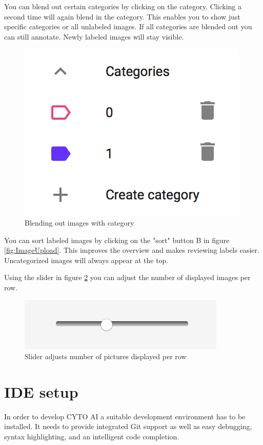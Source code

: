 You can blend out certain categories by
clicking on the category.
Clicking a second time will again blend
in the category.
This enables you to show just specific
categories or all unlabeled images.
If all categories are blended out you can still
annotate. Newly labeled images will stay visible.
 
\begin{figure}[H]
 	\centering
 	\includegraphics[scale=0.8]{bilder/cyto/BlendedOut.png}
 	\caption{Blending out images with category}
 	\label{fig:BlendingOut}
\end{figure}
  
You can sort labeled images by clicking on the "sort" button B in figure \ref{fig:ImageUpload}.
This improves the
overview and makes reviewing labels easier. Uncategorized
images will always appear at the top.
 
Using the slider in figure \ref{fig:Slider} you can adjust
the number of displayed images per row.

\begin{figure}[H]
	\centering
	\includegraphics[scale=0.8]{bilder/cyto/Slider.png}
	\caption{Slider adjusts number of pictures displayed per row}
	\label{fig:Slider}
\end{figure}

\section{IDE setup}
In order to develop CYTO AI a suitable development 
environment has to be installed.
It needs to provide integrated Git support as well as easy debugging, syntax highlighting, and an intelligent code completion.

